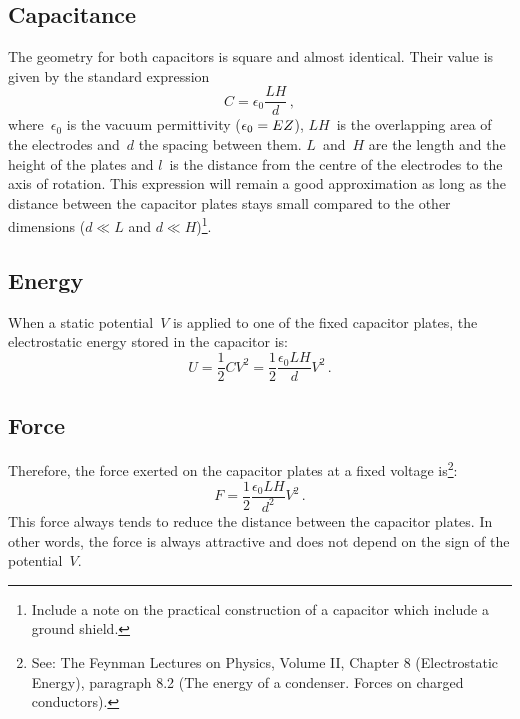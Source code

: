 \subsection{Capacitance}
The geometry for both capacitors is square and almost identical. Their value is given by the standard expression
\begin{equation}
C = \epsilon_0\frac{L H}{d}\,,
\end{equation}
where~$\epsilon_0$ is the vacuum permittivity ($\epsilon_0 = EZ $), $LH$~is the overlapping area of the electrodes and~$d$ the spacing between them.
$L$~and~$H$ are the length and the height of the plates and $l$~is the distance from the centre of the electrodes to the axis of rotation. This expression will remain a good approximation as long as the distance between the capacitor plates stays small compared to the other dimensions ($d\ll L$ and $d\ll H$)\footnote{Include a note on the practical construction of a capacitor which include a ground shield.}. 

\subsection{Energy}
When a static potential~$V$ is applied to one of the fixed capacitor plates, the electrostatic energy stored in the capacitor is:
\begin{equation}
U = \frac{1}{2}C V^2 =
\frac{1}{2} \frac{\epsilon_0 L H}{d} V^2 \,.
\end{equation}

\subsection{Force}
Therefore, the force exerted on the capacitor plates at a fixed voltage is\footnote{See: The Feynman Lectures on Physics, Volume II, Chapter 8 (Electrostatic Energy), paragraph 8.2 (The energy of a condenser. Forces on charged conductors).}:
\begin{equation}
F = \frac{1}{2} \frac{\epsilon_0 L H}{d^2} V^2 \,.
\label{Eq.ElecForce}
\end{equation}
This force always tends to reduce the distance between the capacitor plates.
In other words, the force is always attractive and does not depend on the sign of the potential~$V$.

